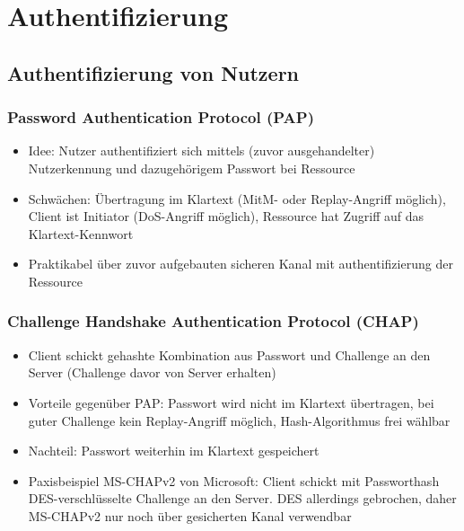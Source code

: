 \section{Authentifizierung}

\subsection{Authentifizierung von Nutzern}

\subsubsection{Password Authentication Protocol (PAP)}
\begin{itemize}
	\item Idee: Nutzer authentifiziert sich mittels (zuvor ausgehandelter) Nutzerkennung und dazugehörigem Passwort bei Ressource
	\item Schwächen: Übertragung im Klartext (MitM- oder Replay-Angriff möglich), Client ist Initiator (DoS-Angriff möglich), Ressource hat Zugriff auf das Klartext-Kennwort
	\item Praktikabel über zuvor aufgebauten sicheren Kanal mit authentifizierung der Ressource
\end{itemize}

\subsubsection{Challenge Handshake Authentication Protocol (CHAP)}
\begin{itemize}
	\item Client schickt gehashte Kombination aus Passwort und Challenge an den Server (Challenge davor von Server erhalten)
	\item Vorteile gegenüber PAP: Passwort wird nicht im Klartext übertragen, bei guter Challenge kein Replay-Angriff möglich, Hash-Algorithmus frei wählbar
	\item Nachteil: Passwort weiterhin im Klartext gespeichert
	\item Paxisbeispiel MS-CHAPv2 von Microsoft: Client schickt mit Passworthash DES-verschlüsselte Challenge an den Server. DES allerdings gebrochen, daher MS-CHAPv2 nur noch über gesicherten Kanal verwendbar
\end{itemize}

